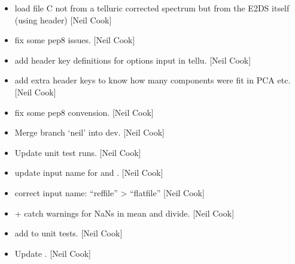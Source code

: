 \documentclass[a4paper,10pt,english]{report}
\begin{document}
\begin{itemize}
\item {} 
 \sphinxhyphen{} load file C not from a telluric corrected
spectrum but from the E2DS itself (using header) {[}Neil Cook{]}

\item {} 
 \sphinxhyphen{} fix some pep8 issues. {[}Neil Cook{]}

\item {} 
 \sphinxhyphen{} add header key definitions for options input in
tellu. {[}Neil Cook{]}

\item {} 
 \sphinxhyphen{} add extra header keys to know how many components
were fit in PCA etc. {[}Neil Cook{]}

\item {} 
 \sphinxhyphen{} fix some pep8 convension. {[}Neil Cook{]}

\item {} 
Merge branch ‘neil’ into dev. {[}Neil Cook{]}

\item {} 
Update unit test runs. {[}Neil Cook{]}

\item {} 
 \sphinxhyphen{} update input name for  and
. {[}Neil Cook{]}

\item {} 
 \sphinxhyphen{} correct input name: “reffile” \textendash{}\textgreater{} “flatfile”
{[}Neil Cook{]}

\item {} 
 +  \sphinxhyphen{} catch warnings for NaNs in mean
and divide. {[}Neil Cook{]}

\item {} 
 \sphinxhyphen{} add  to unit tests. {[}Neil
Cook{]}

\item {} 
Update . {[}Neil Cook{]}

\end{itemize}
\end{document}
